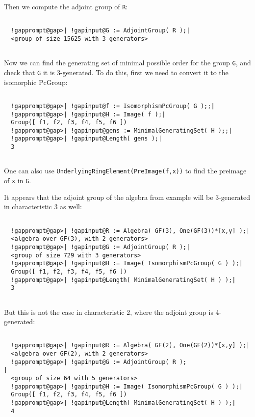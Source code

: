 \documentclass[a4paper,11pt]{report}
\begin{document}
{\begin{Verbatim}[commandchars=!@|,fontsize=\small,frame=single,label=Example]
\end{Verbatim}
 Then we compute the adjoint group of \texttt{R}: 
\begin{Verbatim}[commandchars=!@|,fontsize=\small,frame=single,label=Example]
  
  !gapprompt@gap>| !gapinput@G := AdjointGroup( R );|
  <group of size 15625 with 3 generators>
  
\end{Verbatim}
 Now we can find the generating set of minimal possible order for the group \texttt{G}, and check that \texttt{G} it is 3-generated. To do this, first we need to convert it to the isomorphic
PcGroup: 
\begin{Verbatim}[commandchars=!@|,fontsize=\small,frame=single,label=Example]
  
  !gapprompt@gap>| !gapinput@f := IsomorphismPcGroup( G );;|
  !gapprompt@gap>| !gapinput@H := Image( f );|
  Group([ f1, f2, f3, f4, f5, f6 ])
  !gapprompt@gap>| !gapinput@gens := MinimalGeneratingSet( H );;|
  !gapprompt@gap>| !gapinput@Length( gens );|
  3
  
\end{Verbatim}
 One can also use \texttt{UnderlyingRingElement(PreImage(f,x))} to find the preimage of \texttt{x} in \texttt{G}. 

 It appears that the adjoint group of the algebra from example will be
3-generated in characteristic 3 as well: 
\begin{Verbatim}[commandchars=!@|,fontsize=\small,frame=single,label=Example]
  
  !gapprompt@gap>| !gapinput@R := Algebra( GF(3), One(GF(3))*[x,y] );|
  <algebra over GF(3), with 2 generators>
  !gapprompt@gap>| !gapinput@G := AdjointGroup( R );|
  <group of size 729 with 3 generators>
  !gapprompt@gap>| !gapinput@H := Image( IsomorphismPcGroup( G ) );|
  Group([ f1, f2, f3, f4, f5, f6 ])
  !gapprompt@gap>| !gapinput@Length( MinimalGeneratingSet( H ) );|
  3
  
\end{Verbatim}
 But this is not the case in characteristic 2, where the adjoint group is
4-generated: 
\begin{Verbatim}[commandchars=!@|,fontsize=\small,frame=single,label=Example]
  
  !gapprompt@gap>| !gapinput@R := Algebra( GF(2), One(GF(2))*[x,y] );|
  <algebra over GF(2), with 2 generators>
  !gapprompt@gap>| !gapinput@G := AdjointGroup( R );                   |
  <group of size 64 with 5 generators>
  !gapprompt@gap>| !gapinput@H := Image( IsomorphismPcGroup( G ) );|
  Group([ f1, f2, f3, f4, f5, f6 ])
  !gapprompt@gap>| !gapinput@Length( MinimalGeneratingSet( H ) );|
  4
  
\end{Verbatim}
 }
\end{document}
